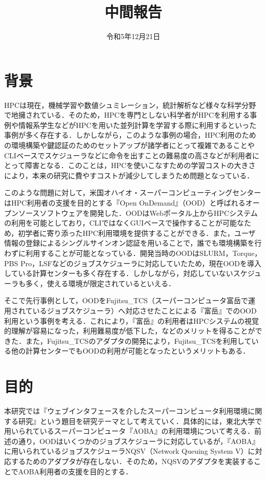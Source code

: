 \documentclass[a4paper,oneside,twocolumn,notitlepage,dvipdfmx]{jsarticle}
\date{令和5年12月21日}
\title{中間報告}
\begin{document}
\maketitle
\section{背景}
HPCは現在，機械学習や数値シュミレーション，統計解析など様々な科学分野で地擁されている．そのため，HPCを専門としない科学者がHPCを利用する事例や情報系学生などがHPCを用いた並列計算を学習する際に利用するといった事例が多く存在する．しかしながら，このような事例の場合，HPC利用のための環境構築や鍵認証のためのセットアップが諸学者にとって複雑であることやCLIベースでスケジューラなどに命令を出すことの難易度の高さなどが利用者にとって障害となる．このことは，HPCを使いこなすための学習コストの大きさにより，本来の研究に費やすコストが減少してしまうため問題となっている．\par
このような問題に対して，米国オハイオ・スーパーコンピューティングセンターはHPC利用者の支援を目的とする『Open OnDemand』（OOD）と呼ばれるオープンソースソフトウェアを開発した．\cite{citation_3}\cite{citation_4}\cite{citation_5}OODはWebポータル上からHPCシステムの利用を可能としており，CLIではなくGUIベースで操作することが可能なため，初学者に寄り添ったHPC利用環境を提供することができる．また，ユーザ情報の登録によるシングルサインオン認証を用いることで，誰でも環境構築を行わずに利用することが可能となっている．開発当時のOODはSLURM，Torque，PBS Pro，LSFなどのジョブスケジューラに対応していたため，現在OODを導入している計算センターも多く存在する．しかしながら，対応していないスケジューラも多く，使える環境が限定されているといえる．\par
そこで先行事例として，OODをFujitsu\_TCS（スーパーコンピュータ富岳で運用されているジョブスケジューラ）へ対応させたことによる『富岳』でのOOD利用という事例を考える．\cite{citation_1}これにより，『富岳』の利用者はHPCシステムの視覚的理解が容易になった，利用難易度が低下した，などのメリットを得ることができた．また，Fujitsu\_TCSのアダプタの開発により，Fujitsu\_TCSを利用している他の計算センターでもOODの利用が可能となったというメリットもある．\par

\section{目的}
本研究では『ウェブインタフェースを介したスーパーコンピュータ利用環境に関する研究』という題目を研究テーマとして考えていく．具体的には，東北大学で用いられているスーパーコンピュータ『AOBA』の利用環境について考える．前述の通り，OODはいくつかのジョブスケジューラに対応しているが，『AOBA』に用いられているジョブスケジューラNQSV（Network Queuing System V）に対応するためのアダプタが存在しない．そのため，NQSVのアダプタを実装することでAOBA利用者の支援を目的とする．\par
\end{document}
